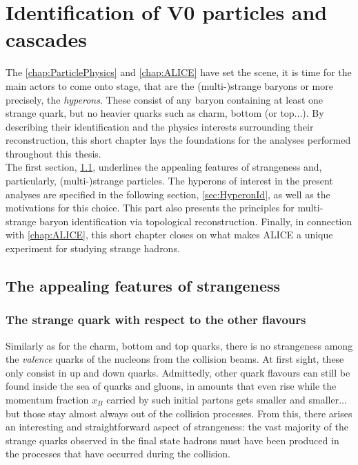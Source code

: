 \newpage
\chapter{Identification of V0 particles and cascades}
\label{chap:V0CascReconstruction}

The \chap\ref{chap:ParticlePhysics} and \ref{chap:ALICE} have set the scene, it is time for the main actors to come onto stage, that are the (multi-)strange baryons or more precisely, the \textit{hyperons}. These consist of any baryon containing at least one strange quark, but no heavier quarks such as charm, bottom (or top...). By describing their identification and the physics interests surrounding their reconstruction, this short chapter lays the foundations for the analyses performed throughout this thesis.\\

The first section, \Sec\ref{sec:StrangenessFeatures}, underlines the appealing features of strangeness and, particularly, (multi-)strange particles. The hyperons of interest in the present analyses are specified in the following section, \Sec\ref{sec:HyperonId}, as well as the motivations for this choice. This part also presents the principles for multi-strange baryon identification via topological reconstruction. Finally, in connection with \chap\ref{chap:ALICE}, this short chapter closes on what makes ALICE a unique experiment for studying strange hadrons.


\section{The appealing features of strangeness}
\label{sec:StrangenessFeatures}

\subsection{The strange quark with respect to the other flavours}

Similarly as for the charm, bottom and top quarks, there is no strangeness among the \emph{valence} quarks of the nucleons from the collision beams. At first sight, these only consist in up and down quarks.
Admittedly, other quark flavours can still be found inside the sea of quarks and gluons,
in amounts that even rise while the momentum fraction $x_B$ carried by such initial partons gets smaller and smaller... but those stay almost always out of the collision processes\footnotemark.
From this, there arises an interesting and straightforward aspect of strangeness: the vast majority of the strange quarks observed in the final state hadrons must have been produced in the processes that have occurred during the collision.

